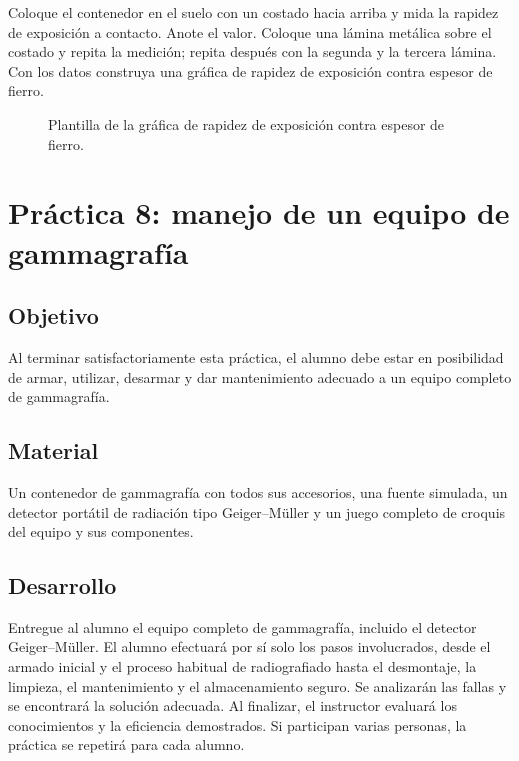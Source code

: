 Coloque el contenedor en el suelo con un costado hacia arriba y mida la rapidez de exposición a contacto. Anote el valor. Coloque una lámina metálica sobre el costado y repita la medición; repita después con la segunda y la tercera lámina. Con los datos construya una gráfica de rapidez de exposición contra espesor de fierro.

\begin{figure}[htbp]
  \centering
  \caption{Plantilla de la gráfica de rapidez de exposición contra espesor de fierro.}
  \label{fig:practica7-grafica}
\end{figure}

\section{Práctica 8: manejo de un equipo de gammagrafía}

\subsection*{Objetivo}
Al terminar satisfactoriamente esta práctica, el alumno debe estar en posibilidad de armar, utilizar, desarmar y dar mantenimiento adecuado a un equipo completo de gammagrafía.

\subsection*{Material}
Un contenedor de gammagrafía con todos sus accesorios, una fuente simulada, un detector portátil de radiación tipo Geiger--Müller y un juego completo de croquis del equipo y sus componentes.

\subsection*{Desarrollo}
Entregue al alumno el equipo completo de gammagrafía, incluido el detector Geiger--Müller. El alumno efectuará por sí solo los pasos involucrados, desde el armado inicial y el proceso habitual de radiografiado hasta el desmontaje, la limpieza, el mantenimiento y el almacenamiento seguro. Se analizarán las fallas y se encontrará la solución adecuada. Al finalizar, el instructor evaluará los conocimientos y la eficiencia demostrados. Si participan varias personas, la práctica se repetirá para cada alumno.

